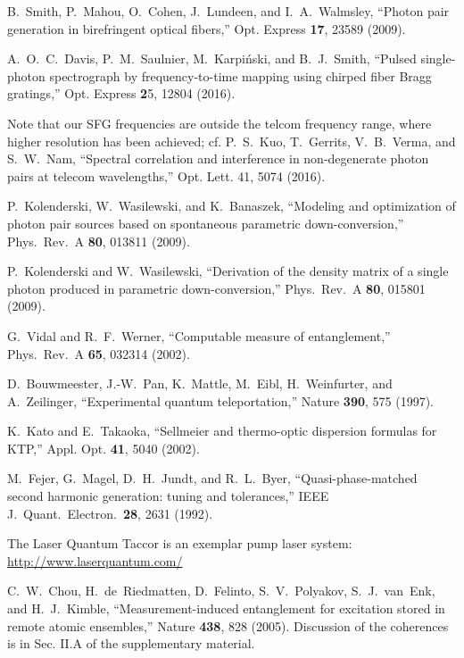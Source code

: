 \documentclass[twocolumn,amssymb, nobibnotes, showpacs, aps, pra,10pt]{revtex4-1}
\begin{document}
\begin{thebibliography}{99}
 B.~Smith, P.~Mahou, O.~Cohen, J.~Lundeen, and I.~A.~Walmsley, ``Photon pair generation in birefringent optical fibers,'' Opt. Express {\bf 17}, 23589 (2009).

A.~O.~C.~Davis, P.~M.~Saulnier, M.~Karpi\'nski, and B.~J.~Smith, ``Pulsed single-photon spectrograph by frequency-to-time mapping using chirped fiber Bragg gratings,'' Opt. Express {\textbf 25}, 12804 (2016).

 Note that our SFG frequencies are outside the telcom frequency range, where higher resolution has been achieved; cf. P.~S.~Kuo, T.~Gerrits, V.~B.~Verma, and S.~W.~Nam, ``Spectral correlation and interference in non-degenerate photon pairs at telecom wavelengths,'' Opt. Lett. 41, 5074 (2016).

P.~Kolenderski, W.~Wasilewski, and K.~Banaszek, ``Modeling and optimization of photon pair sources based on spontaneous parametric down-conversion,'' Phys.~Rev.~A {\bf80}, 013811 (2009).

P.~Kolenderski and W.~Wasilewski, ``Derivation of the density matrix of a single photon produced in parametric down-conversion,'' Phys.~Rev.~A {\bf80}, 015801 (2009).

G.~Vidal and R.~F.~Werner, ``Computable measure of entanglement,'' Phys.~Rev.~A {\bf65}, 032314 (2002).

 D.~Bouwmeester, J.-W.~Pan, K.~Mattle, M.~Eibl, H.~Weinfurter, and A.~Zeilinger, ``Experimental quantum teleportation,'' Nature {\bf 390}, 575 (1997).

 K.~Kato and E.~Takaoka, ``Sellmeier and thermo-optic dispersion formulas for KTP,'' Appl. Opt. \textbf{41}, 5040 (2002).

 M.~Fejer, G.~Magel, D.~H.~Jundt, and R.~L.~Byer, ``Quasi-phase-matched second harmonic generation: tuning and tolerances,'' IEEE J.~Quant.~Electron.~{\bf 28}, 2631 (1992).

 The Laser Quantum Taccor is an exemplar pump laser system: \url{http://www.laserquantum.com/}

C.~W.~Chou, H.~de~Riedmatten, D.~Felinto, S.~V.~Polyakov, S.~J.~van~Enk, and H.~J.~Kimble, ``Measurement-induced entanglement for excitation stored in remote atomic ensembles,'' Nature {\bf 438}, 828 (2005). Discussion of the coherences is in Sec. II.A of the supplementary material.


\end{thebibliography}
\end{document}
